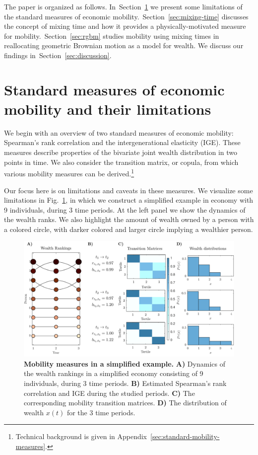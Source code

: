 \documentclass[11pt]{article}
\newcommand{\Sref}[1]{Section~\ref{sec:#1}}
\newcommand{\fref}[1]{Fig.~\ref{fig:#1}}
\numberwithin{equation}{section}
\begin{document}
The paper is organized as follows. In~\Sref{standard-measures} we present some limitations of the standard measures of economic mobility.~\Sref{mixing-time} discusses the concept of mixing time and how it provides a physically-motivated measure for mobility.~\Sref{rgbm} studies mobility using mixing times in reallocating geometric Brownian motion as a model for wealth. We discuss our findings in~\Sref{discussion}.

\section{Standard measures of economic mobility and their limitations}\label{sec:standard-measures}

We begin with an overview of two standard measures of economic mobility: Spearman's rank correlation and the intergenerational elasticity (IGE). These measures describe properties of the bivariate joint wealth distribution in two points in time. We also consider the transition matrix, or copula, from which various mobility measures can be derived.\footnote{Technical background is given in Appendix~\ref{sec:standard-mobility-measures}.}

Our focus here is on limitations and caveats in these measures. We visualize some limitations in \fref{standard-mobility-measures}, in which we construct a simplified example in economy with 9 individuals, during 3 time periods. At the left panel we show the dynamics of the wealth ranks. We also highlight the amount of wealth owned by a person with a colored circle, with darker colored and larger circle implying a wealthier person.

\begin{figure}[!htb]
\centering
\includegraphics[width=1.0\textwidth]{figs/fig_mobility_measures.pdf}
\caption{\textbf{Mobility measures in a simplified example.} \textbf{A)} Dynamics of the wealth rankings in a simplified economy consisting of 9 individuals, during 3 time periods. \textbf{B)} Estimated Spearman's rank correlation and IGE during the studied periods. \textbf{C)} The corresponding mobility transition matrices. \textbf{D)} The distribution of wealth $x(t)$ for the 3 time periods.
\label{fig:standard-mobility-measures}}
\end{figure}
\end{document}
